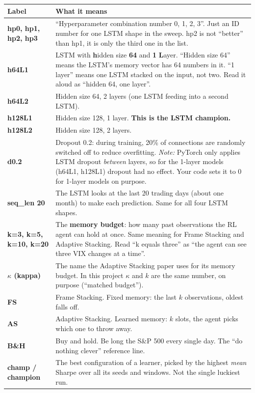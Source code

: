 \documentclass[11pt,a4paper]{article}
\begin{document}
\renewcommand{\arraystretch}{1.25}
\begin{longtable}{>{\bfseries}p{2.6cm} p{12.2cm}}
\toprule
Label & What it means \\
\midrule
\endhead
hp0, hp1, hp2, hp3 & ``Hyperparameter combination number 0, 1, 2, 3''. Just an ID number for
  one LSTM shape in the sweep. hp2 is not ``better'' than hp1, it is only the third one
  in the list. \\
h64L1 & LSTM with \textbf{h}idden size \textbf{64} and \textbf{1} \textbf{L}ayer.
  ``Hidden size 64'' means the LSTM's memory vector has 64 numbers in it. ``1 layer''
  means one LSTM stacked on the input, not two. Read it aloud as ``hidden 64, one layer''. \\
h64L2 & Hidden size 64, 2 layers (one LSTM feeding into a second LSTM). \\
h128L1 & Hidden size 128, 1 layer. \textbf{This is the LSTM champion.} \\
h128L2 & Hidden size 128, 2 layers. \\
d0.2 & Dropout 0.2: during training, 20\% of connections are randomly switched off to
  reduce overfitting. \emph{Note:} PyTorch only applies LSTM dropout \emph{between} layers,
  so for the 1-layer models (h64L1, h128L1) dropout had no effect. Your code sets it to 0
  for 1-layer models on purpose. \\
seq\_len 20 & The LSTM looks at the last 20 trading days (about one month) to make each
  prediction. Same for all four LSTM shapes. \\
k=3, k=5, k=10, k=20 & The \textbf{memory budget}: how many past observations the RL agent
  can hold at once. Same meaning for Frame Stacking and Adaptive Stacking. Read ``k equals
  three'' as ``the agent can see three VIX changes at a time''. \\
$\kappa$ (kappa) & The name the Adaptive Stacking paper uses for its memory budget. In this
  project $\kappa$ and $k$ are the same number, on purpose (``matched budget''). \\
FS & Frame Stacking. Fixed memory: the last $k$ observations, oldest falls off. \\
AS & Adaptive Stacking. Learned memory: $k$ slots, the agent picks which one to throw away. \\
B\&H & Buy and hold. Be long the S\&P 500 every single day. The ``do nothing clever''
  reference line. \\
champ / champion & The best configuration of a learner, picked by the highest
  \emph{mean} Sharpe over all its seeds and windows. Not the single luckiest run. \\

\end{longtable}
\end{document}
